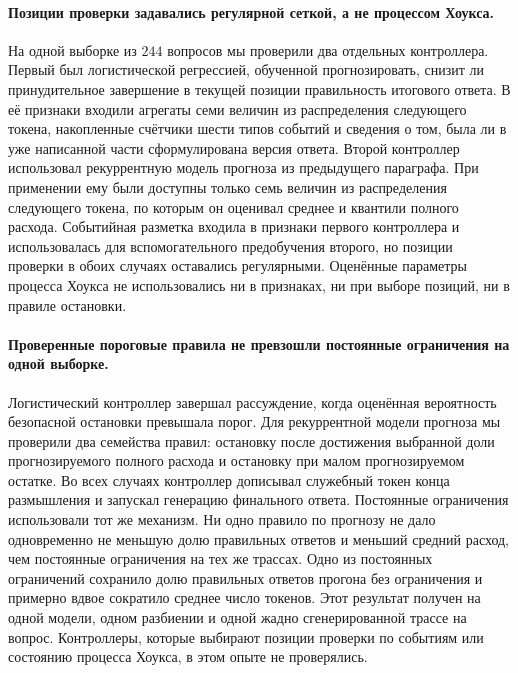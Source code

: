 \documentclass[11pt]{article}
\begin{document}
\paragraph{Позиции проверки задавались регулярной сеткой, а не процессом Хоукса.} На одной выборке из $244$ вопросов мы проверили два отдельных контроллера. Первый был логистической регрессией, обученной прогнозировать, снизит ли принудительное завершение в текущей позиции правильность итогового ответа. В её признаки входили агрегаты семи величин из распределения следующего токена, накопленные счётчики шести типов событий и сведения о том, была ли в уже написанной части сформулирована версия ответа. Второй контроллер использовал рекуррентную модель прогноза из предыдущего параграфа. При применении ему были доступны только семь величин из распределения следующего токена, по которым он оценивал среднее и квантили полного расхода. Событийная разметка входила в признаки первого контроллера и использовалась для вспомогательного предобучения второго, но позиции проверки в обоих случаях оставались регулярными. Оценённые параметры процесса Хоукса не использовались ни в признаках, ни при выборе позиций, ни в правиле остановки.

\paragraph{Проверенные пороговые правила не превзошли постоянные ограничения на одной выборке.} Логистический контроллер завершал рассуждение, когда оценённая вероятность безопасной остановки превышала порог. Для рекуррентной модели прогноза мы проверили два семейства правил: остановку после достижения выбранной доли прогнозируемого полного расхода и остановку при малом прогнозируемом остатке. Во всех случаях контроллер дописывал служебный токен конца размышления и запускал генерацию финального ответа. Постоянные ограничения использовали тот же механизм. Ни одно правило по прогнозу не дало одновременно не меньшую долю правильных ответов и меньший средний расход, чем постоянные ограничения на тех же трассах. Одно из постоянных ограничений сохранило долю правильных ответов прогона без ограничения и примерно вдвое сократило среднее число токенов. Этот результат получен на одной модели, одном разбиении и одной жадно сгенерированной трассе на вопрос. Контроллеры, которые выбирают позиции проверки по событиям или состоянию процесса Хоукса, в этом опыте не проверялись.
\end{document}
